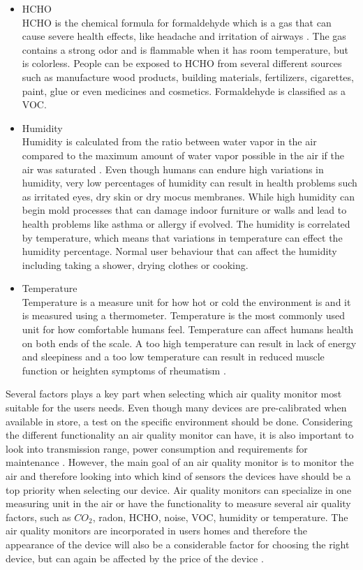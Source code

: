 \begin{itemize}
     \item HCHO\\
        HCHO is the chemical formula for formaldehyde which is a gas that can cause severe health effects, like headache and irritation of airways \cite{HCHO}. The gas contains a strong odor and is flammable when it has room temperature, but is colorless. People can be exposed to HCHO from several different sources such as manufacture wood products, building materials, fertilizers, cigarettes, paint, glue or even medicines and cosmetics. Formaldehyde is classified as a \gls{VOC}.\\
    \item Humidity\\
        Humidity is calculated from the ratio between water vapor in the air compared to the maximum amount of water vapor possible in the air if the air was saturated \cite{RecommendedIAQ}. Even though humans can endure high variations in humidity, very low percentages of humidity can result in health problems such as irritated eyes, dry skin or dry mocus membranes. While high humidity can begin mold processes that can damage indoor furniture or walls and lead to health problems like asthma or allergy if evolved. The humidity is correlated by temperature, which means that variations in temperature can effect the humidity percentage. Normal user behaviour that can affect the humidity including taking a shower, drying clothes or cooking. \\
    \item Temperature\\
        Temperature is a measure unit for how hot or cold the environment is and it is measured using a thermometer. Temperature is the most commonly used unit for how comfortable humans feel. Temperature can affect humans health on both ends of the scale. A too high temperature can result in lack of energy and sleepiness and a too low temperature can result in reduced muscle function or heighten symptoms of rheumatism \cite{Temp}.\\
\end{itemize}

Several factors plays a key part when selecting which air quality monitor most suitable for the users needs. Even though many devices are pre-calibrated when available in store, a test on the specific environment should be done. Considering the different functionality an air quality monitor can have, it is also important to look into transmission range, power consumption and requirements for maintenance \cite{AQMBigSource}. However, the main goal of an air quality monitor is to monitor the air and therefore looking into which kind of sensors the devices have should be a top priority when selecting our device. Air quality monitors can specialize in one measuring unit in the air or have the functionality to measure several air quality factors, such as \(CO_2\), radon, HCHO, noise, \gls{VOC}, humidity or temperature. The air quality monitors are incorporated in users homes and therefore the appearance of the device will also be a considerable factor for choosing the right device, but can again be affected by the price of the device \cite{IAQMonitorCommunicationReview}. 

